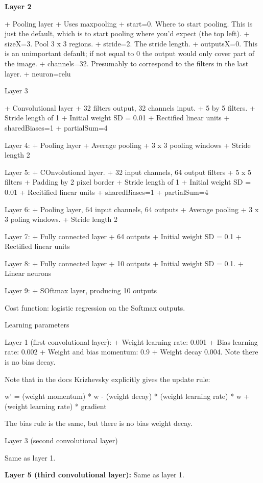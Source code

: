 \documentclass[12pt]{report}
\begin{document}
\textbf{Layer 2}

+ Pooling layer
+ Uses maxpooling
+ start=0.  Where to start pooling.  This is just the default, which
  is to start pooling where you'd expect (the top left).
+ sizeX=3.  Pool 3 x 3 regions.
+ stride=2.  The stride length.
+ outputsX=0.  This is an unimportant default; if not equal to 0 the
  output would only cover part of the image.
+ channels=32.  Presumably to correspond to the filters in the last
  layer.
+ neuron=relu

Layer 3

+ Convolutional layer
+ 32 filters output, 32 channels input.
+ 5 by 5 filters.
+ Stride length of 1
+ Initial weight SD = 0.01
+ Rectified linear units
+ sharedBiases=1
+ partialSum=4

Layer 4:
+ Pooling layer
+ Average pooling
+ 3 x 3 pooling windows
+ Stride length 2

Layer 5:
+ COnvolutional layer.
+ 32 input channels, 64 output filters
+ 5 x 5 filters
+ Padding by 2 pixel border
+ Stride length of 1
+ Initial weight SD = 0.01
+ Recitified linear units
+ sharedBiases=1
+ partialSum=4

Layer 6:
+ Pooling layer, 64 input channels, 64 outputs
+ Average pooling
+ 3 x 3 poling windows.
+ Stride length 2

Layer 7:
+ Fully connected layer
+ 64 outputs
+ Initial weight SD = 0.1
+ Rectified linear units

Layer 8:
+ Fully connected layer
+ 10 outputs
+ Initial weight SD = 0.1.
+ Linear neurons

Layer 9:
+ SOftmax layer, producing 10 outputs

Cost function: logistic regression on the Softmax outputs.


Learning parameters

Layer 1 (first convolutional layer):
+ Weight learning rate: 0.001
+ Bias learning rate: 0.002
+ Weight and bias momentum: 0.9
+ Weight decay 0.004.  Note there is no bias decay.

Note that in the docs Krizhevsky explicitly gives the update rule:

w' = (weight momentum) * w - (weight decay) * (weight learning rate) * w
+ (weight learning rate) * gradient

The bias rule is the same, but there is no bias weight decay.


Layer 3 (second convolutional layer)

Same as layer 1.

\textbf{Layer 5 (third convolutional layer):} Same as layer 1.
\end{document}
